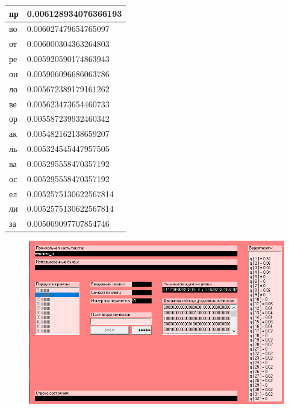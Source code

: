 \begin{table}[]
\begin{tabular}{ll}
\multicolumn{1}{|l|}{пр}          & \multicolumn{1}{l|}{0.006128934076366193}         \\ \hline
\multicolumn{1}{|l|}{во}          & \multicolumn{1}{l|}{0.006027479654765097}         \\ \hline
\multicolumn{1}{|l|}{от}          & \multicolumn{1}{l|}{0.006000304363264803}         \\ \hline
\multicolumn{1}{|l|}{ре}          & \multicolumn{1}{l|}{0.005920590174863943}         \\ \hline
\multicolumn{1}{|l|}{он}          & \multicolumn{1}{l|}{0.005906096686063786}         \\ \hline
\multicolumn{1}{|l|}{ло}          & \multicolumn{1}{l|}{0.005672389179161262}         \\ \hline
\multicolumn{1}{|l|}{ве}          & \multicolumn{1}{l|}{0.005623473654460733}         \\ \hline
\multicolumn{1}{|l|}{ор}          & \multicolumn{1}{l|}{0.005587239932460342}         \\ \hline
\multicolumn{1}{|l|}{ак}          & \multicolumn{1}{l|}{0.005482162138659207}         \\ \hline
\multicolumn{1}{|l|}{ль}          & \multicolumn{1}{l|}{0.005324545447957505}         \\ \hline
\multicolumn{1}{|l|}{ва}          & \multicolumn{1}{l|}{0.005295558470357192}         \\ \hline
\multicolumn{1}{|l|}{ос}          & \multicolumn{1}{l|}{0.005295558470357192}         \\ \hline
\multicolumn{1}{|l|}{ел}          & \multicolumn{1}{l|}{0.0052575130622567814}        \\ \hline
\multicolumn{1}{|l|}{ли}          & \multicolumn{1}{l|}{0.0052575130622567814}        \\ \hline
\multicolumn{1}{|l|}{за}          & \multicolumn{1}{l|}{0.005069097707854746}         \\ \hline
\end{tabular}
\end{table}


\begin{figure}[h!]
\centering
\includegraphics[width=.98\textwidth]{pics/pink1.png}

\label{fig:overleaf}
\end{figure}


